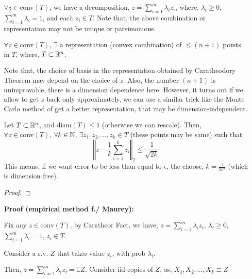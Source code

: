 \documentclass[12pt]{article}
\begin{document}
\begin{theorembox}
    $\forall z \in \text{conv}(T)$, we have a decomposition, $z = \sum_{i=1}^m \lambda_i z_i$, where, $\lambda_i \geq 0$, $\sum_{i=1}^m \lambda_i = 1$, and each $z_i \in T$. Note that, the above combination or representation may not be unique or parsimonious.
\end{theorembox}

\begin{theorembox}
    $\forall z \in \text{conv}(T)$, $\exists$ a representation (convex combination) of $\leq (n+1)$ points in $T$, where, $T \subset \mathbb{R}^n$.
\end{theorembox}

Note that, the choice of basis in the representation obtained by Caratheodory Theorem may depend on the choice of $z$. Also, the number $(n+1)$ is unimprovable, there is a dimension dependence here. However, it turns out if we allow to get $z$ back only approximately, we can use a similar trick like the Monte Carlo method of get a better representation, that may be dimension-independent.

\begin{theorembox}
    Let $T \subset \mathbb{R}^n$, and $\text{diam}(T) \leq 1$ (otherwise we can rescale). Then, $\forall z \in \text{conv}(T)$, $\forall k \in \mathbb{N}$, $\exists z_1, z_2, \ldots, z_k \in T$ (these points may be same) such that
    \begin{equation*}
        \left\Vert z - \frac{1}{k} \sum_{i=1}^k z_i\right\Vert_2 \leq \frac{1}{\sqrt{2k}}
    \end{equation*}
    This means, if we want error to be less than equal to $\epsilon$, the choose, $k = \frac{1}{2\epsilon^2}$ (which is dimension free).
\end{theorembox}

\begin{proof}
    
\end{proof}



\textbf{Proof (empirical method f./ Maurey):}

Fix any $z \in \text{conv}(T)$, by Caratheor Fact, we have,
$z = \sum_{i=1}^m \lambda_i z_i$, $\lambda_i \geq 0$, $\sum_{i=1}^m \lambda_i = 1$, $z_i \in T$.

Consider a r.v. $Z$ that takes value $z_i$, with prob $\lambda_i$.

Then, $z = \sum_{i=1}^m \lambda_i z_i = \mathbb{E}Z$. Consider iid copies of $Z$, as, $X_1, X_2, \ldots, X_k \equiv Z$
\end{document}
